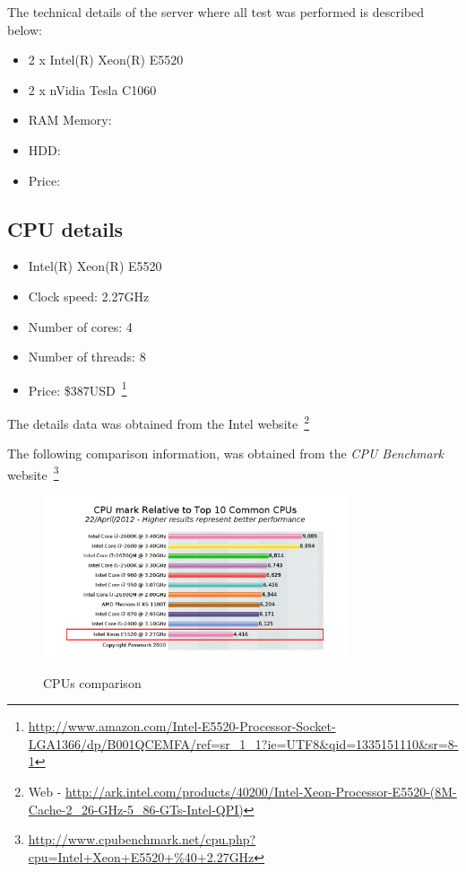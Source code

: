 The technical details of the server where all
test was performed is described below:


\begin{itemize}
    \item 2 x Intel(R) Xeon(R) E5520
    \item 2 x nVidia Tesla C1060
    \item RAM Memory: 
    \item HDD: 
    \item Price: 
\end{itemize}

\subsection{CPU details}
\begin{itemize}
    \item Intel(R) Xeon(R) E5520
    \item Clock speed: 2.27GHz
    \item Number of cores: 4
    \item Number of threads: 8
    \item Price: \$387USD~\footnote{\url{http://www.amazon.com/Intel-E5520-Processor-Socket-LGA1366/dp/B001QCEMFA/ref=sr\_1\_1?ie=UTF8&qid=1335151110&sr=8-1}}
\end{itemize}

The details data was obtained from the Intel website~\footnote{
Web - \url{http://ark.intel.com/products/40200/Intel-Xeon-Processor-E5520-(8M-Cache-2\_26-GHz-5\_86-GTs-Intel-QPI)}}

The following comparison information,
was obtained from the \emph{CPU Benchmark} website~\footnote{
\url{http://www.cpubenchmark.net/cpu.php?cpu=Intel+Xeon+E5520+\%40+2.27GHz}}

\begin{figure}[h!]
    \centering
    \includegraphics[width=0.8\textwidth]{img/cpu-cpu-ranking.png}
    \label{fig:cpu1}
    \caption{CPUs comparison}
\end{figure}

